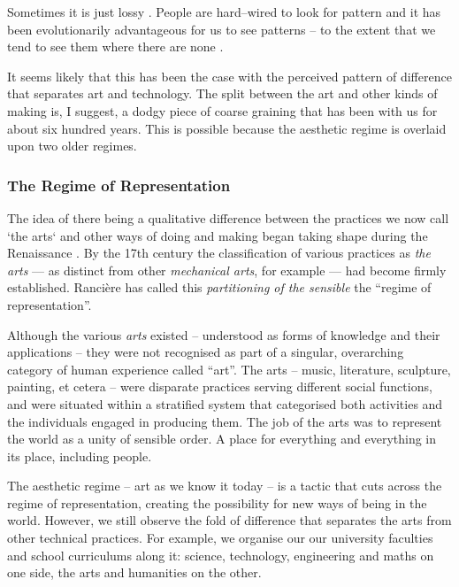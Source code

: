 \documentclass[letter:wpaper]{article}
\begin{document}
    Sometimes it is just lossy \citep[p.8]{FlackCrsGrnng2017}. People are hard–wired to look for pattern and it has been evolutionarily advantageous for us to see patterns -- to the extent that we tend to see them where there are none \citep{FristonThFrEnrgPrncpl2010}.
    
    It seems likely that this has been the case with the perceived pattern of difference that separates art and technology. The split between the art and other kinds of making is, I suggest, a dodgy piece of coarse graining that has been with us for about six hundred years. This is possible because the aesthetic regime is overlaid upon two older regimes. 
    
    \subsubsection{The Regime of Representation}

    The idea of there being a qualitative difference between the practices we now call ‘the arts‘ and other ways of doing and making began taking shape during the Renaissance \citep[p.136]{TatarkiewiczWhtIsArt1971}. By the 17th century the classification of various practices as \emph{the arts} — as distinct from other \emph{mechanical arts}, for example — had become firmly established. Rancière has called this \emph{partitioning of the sensible} the ``regime of representation''.
    
    Although the various \emph{arts} existed – understood as forms of knowledge and their applications – they were not recognised as part of a singular, overarching category of human experience called ``art''. The arts – music, literature, sculpture, painting, et cetera – were disparate practices serving different social functions, and were situated within a stratified system that categorised both activities and the individuals engaged in producing them. The job of the arts was to represent the world as a unity of sensible order. A place for everything and everything in its place, including people.
    
    The aesthetic regime -- art as we know it today -- is a tactic that cuts across the regime of representation, creating the possibility for new ways of being in the world. However, we still observe the fold of difference that separates the arts from other technical practices. For example, we organise our our university faculties and school curriculums along it: science, technology, engineering and maths on one side, the arts and humanities on the other. 
    
\end{document}
